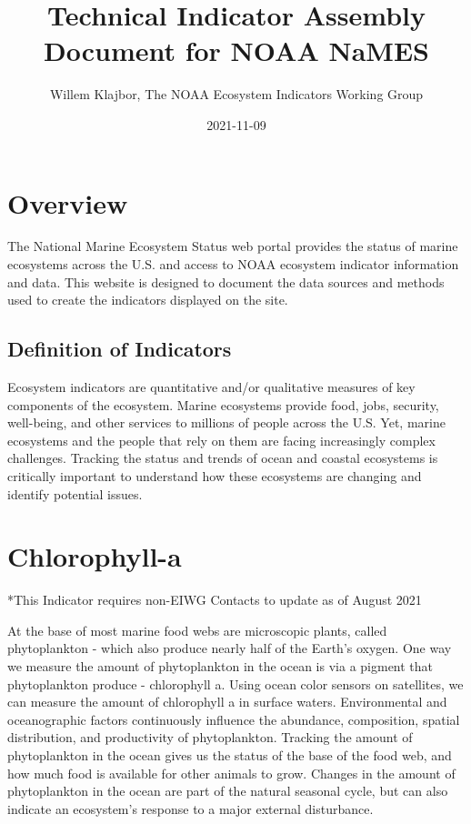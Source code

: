 \documentclass[
]{book}
\title{Technical Indicator Assembly Document for NOAA NaMES}
\author{Willem Klajbor, The NOAA Ecosystem Indicators Working Group}
\date{2021-11-09}
\begin{document}
\maketitle

{
\setcounter{tocdepth}{1}
\tableofcontents
}
\hypertarget{overview}{%
\chapter*{Overview}\label{overview}}

The National Marine Ecosystem Status web portal provides the status of marine ecosystems across the U.S. and access to NOAA ecosystem indicator information and data. This website is designed to document the data sources and methods used to create the indicators displayed on the site.

\hypertarget{definition-of-indicators}{%
\section{Definition of Indicators}\label{definition-of-indicators}}

Ecosystem indicators are quantitative and/or qualitative measures of key components of the ecosystem. Marine ecosystems provide food, jobs, security, well-being, and other services to millions of people across the U.S. Yet, marine ecosystems and the people that rely on them are facing increasingly complex challenges. Tracking the status and trends of ocean and coastal ecosystems is critically important to understand how these ecosystems are changing and identify potential issues.

\hypertarget{chlorophyll-a}{%
\chapter{Chlorophyll-a}\label{chlorophyll-a}}

*This Indicator requires non-EIWG Contacts to update as of August 2021

At the base of most marine food webs are microscopic plants, called phytoplankton - which also produce nearly half of the Earth's oxygen. One way we measure the amount of phytoplankton in the ocean is via a pigment that phytoplankton produce - chlorophyll a. Using ocean color sensors on satellites, we can measure the amount of chlorophyll a in surface waters. Environmental and oceanographic factors continuously influence the abundance, composition, spatial distribution, and productivity of phytoplankton. Tracking the amount of phytoplankton in the ocean gives us the status of the base of the food web, and how much food is available for other animals to grow. Changes in the amount of phytoplankton in the ocean are part of the natural seasonal cycle, but can also indicate an ecosystem's response to a major external disturbance.
\end{document}

